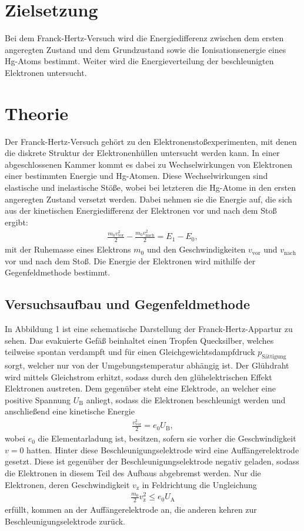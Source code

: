 \section{Zielsetzung}
\label{sec:Zielsetzung}
Bei dem Franck-Hertz-Versuch wird die Energiedifferenz
zwischen dem ersten angeregten Zustand und dem Grundzustand sowie die Ionisationsenergie eines
Hg-Atoms bestimmt. Weiter wird die Energieverteilung der beschleunigten Elektronen untersucht.


\section{Theorie}
\label{sec:Theorie}
Der Franck-Hertz-Versuch gehört zu den Elektronenstoßexperimenten, mit denen die
diskrete Struktur der Elektronenhüllen untersucht werden kann. In einer abgeschlossenen
 Kammer kommt es dabei zu Wechselwirkungen von Elektronen einer bestimmten Energie und
Hg-Atomen. Diese Wechselwirkungen sind elastische und inelastische Stöße, wobei bei
letzteren die Hg-Atome in den ersten angeregten Zustand versetzt werden. Dabei
nehmen sie die Energie auf, die sich aus der kinetischen Energiedifferenz der Elektronen vor und
nach dem Stoß ergibt:
\begin{align}
\frac{m_\text{0} v_\text{vor}^{2}}{2} - \frac{m_\text{0} v_\text{nach}^{2}}{2} = E_\text{1} - E_\text{0},
\end{align}
mit der Ruhemasse eines Elektrons $m_\text{0}$ und den Geschwindigkeiten $v_\text{vor}$
und $v_\text{nach}$ vor und nach dem Stoß. Die Energie der Elektronen wird mithilfe der
Gegenfeldmethode bestimmt.

\subsection{Versuchsaufbau und Gegenfeldmethode}
In Abbildung 1 ist eine schematische Darstellung der Franck-Hertz-Appartur zu sehen.
Das evakuierte Gefäß beinhaltet einen Tropfen Quecksilber, welches teilweise spontan verdampft
und für einen Gleichgewichtsdampfdruck $p_\text{Sättigung}$ sorgt, welcher nur von der
Umgebungstemperatur abhängig ist.
Der Glühdraht wird mittels Gleichstrom erhitzt, sodass durch den glühelektrischen Effekt
Elektronen austreten. Dem gegenüber steht eine Elektrode, an welcher eine positive
Spannung $U_\text{B}$ anliegt, sodass die Elektronen beschleunigt werden und anschließend
eine kinetische Energie
\begin{align}
\frac{v_\text{vor}^{2}}{2} = e_\text{0} U_\text{B},
\end{align}
wobei $e_\text{0}$ die Elementarladung ist, besitzen, sofern sie vorher die Geschwindigkeit $v = 0$ hatten.
Hinter diese Beschleunigungselektrode wird eine Auffängerelektrode gesetzt. 
Diese ist gegenüber der Beschleunigungselektrode negativ geladen, 
sodass die Elektronen in diesem Teil des Aufbaus abgebremst werden. Nur die Elektronen,
 deren Geschwindigkeit $v_\text{z}$ in Feldrichtung die Ungleichung
\begin{align*}
\frac{m_\text{0}}{2} v_\text{z}^{2} \leq e_\text{0} U_\text{A}
\end{align*}
erfüllt, kommen an der Auffängerelektrode an, die anderen kehren zur Beschleunigungselektrode zurück.

